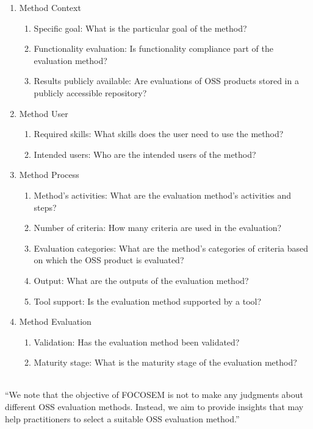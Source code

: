 \documentclass[DIV=calc,paper=a4,fontsize=9pt,twocolumn]{scrartcl}
\begin{document}
\begin{enumerate}
    \item Method Context
    \begin{enumerate}
        \item Specific goal: What is the particular goal of the method?
        \item Functionality evaluation: Is functionality compliance part of the evaluation method?
        \item Results publicly available: Are evaluations of OSS products stored in a publicly accessible repository?
    \end{enumerate}
    \item Method User
    \begin{enumerate}
        \item Required skills: What skills does the user need to use the method?
        \item Intended users: Who are the intended users of the method?
    \end{enumerate}
    \item Method Process
    \begin{enumerate}
        \item Method's activities: What are the evaluation method's activities and steps? 
        \item Number of criteria: How many criteria are used in the evaluation?
        \item Evaluation categories: What are the method's categories of criteria based on which the OSS product is evaluated?
        \item Output: What are the outputs of the evaluation method?
        \item Tool support: Is the evaluation method supported by a tool?
    \end{enumerate}
    \item Method Evaluation
    \begin{enumerate}
        \item Validation: Has the evaluation method been validated?
        \item Maturity stage: What is the maturity stage of the evaluation method?
    \end{enumerate}
\end{enumerate}

\citep{stol2010comparison}
\\

\enquote{We note that the objective of FOCOSEM is not to make any judgments about different OSS evaluation methods. Instead, we aim to provide insights that may help practitioners to select a suitable OSS evaluation method.} \citep{stol2010comparison}
\end{document}
